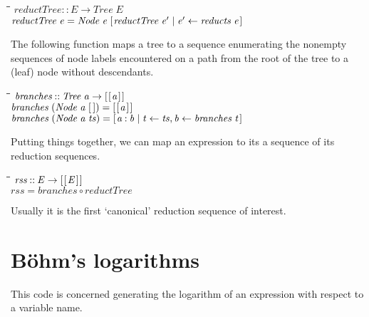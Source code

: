 \documentclass{article}
\newlength{\lwidth}\setlength{\lwidth}{4.5cm}
\newlength{\cwidth}\setlength{\cwidth}{8mm} %
\newcommand{\Conid}[1]{\mathit{#1}}
\newcommand{\Varid}[1]{\mathit{#1}}
\begin{document}
\begin{tabbing}
\qquad\=\hspace{\lwidth}\=\hspace{\cwidth}\=\+\kill
${\Varid{reductTree}\mathbin{::}\Conid{E}\to \Conid{Tree}\;\Conid{E}}$\\
${\Varid{reductTree}\;\Varid{e}\mathrel{=}\Conid{Node}\;\Varid{e}\;[\mskip1.5mu \Varid{reductTree}\;\Varid{e'}\mid \Varid{e'}\leftarrow \Varid{reducts}\;\Varid{e}\mskip1.5mu]}$
\end{tabbing}
The following function maps a tree to
a sequence enumerating the nonempty sequences of
node labels encountered on a path from the root of the tree to a (leaf) node without descendants.
\begin{tabbing}
\qquad\=\hspace{\lwidth}\=\hspace{\cwidth}\=\+\kill
${\Varid{branches}\mathbin{::}\Conid{Tree}\;\Varid{a}\to [\mskip1.5mu [\mskip1.5mu \Varid{a}\mskip1.5mu]\mskip1.5mu]}$\\
${\Varid{branches}\;(\Conid{Node}\;\Varid{a}\;[\mskip1.5mu \mskip1.5mu])\mathrel{=}[\mskip1.5mu [\mskip1.5mu \Varid{a}\mskip1.5mu]\mskip1.5mu]}$\\
${\Varid{branches}\;(\Conid{Node}\;\Varid{a}\;\Varid{ts})\mathrel{=}[\mskip1.5mu \Varid{a}\mathbin{:}\Varid{b}\mid \Varid{t}\leftarrow \Varid{ts},\Varid{b}\leftarrow \Varid{branches}\;\Varid{t}\mskip1.5mu]}$
\end{tabbing}
Putting things together, we can map an expression to its
a sequence of its reduction sequences. 
\begin{tabbing}
\qquad\=\hspace{\lwidth}\=\hspace{\cwidth}\=\+\kill
${\Varid{rss}\mathbin{::}\Conid{E}\to [\mskip1.5mu [\mskip1.5mu \Conid{E}\mskip1.5mu]\mskip1.5mu]}$\\
${\Varid{rss}\mathrel{=}\Varid{branches}\mathbin{\circ}\Varid{reductTree}}$
\end{tabbing}
Usually it is the first `canonical' reduction sequence of interest.



\section{B{\"o}hm's logarithms}

This code is concerned generating the logarithm of an expression
with respect to a variable name.
\end{document}
